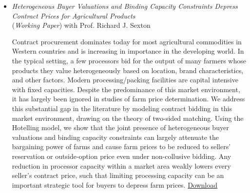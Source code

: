 \documentclass{article}[12]
\begin{document}
\begin{itemize}[itemsep=1.5em]
\item \emph{Heterogeneous Buyer Valuations and Binding Capacity Constraints Depress Contract Prices for Agricultural Products}
\\ (\emph{Working Paper}) with Prof. Richard J. Sexton

Contract procurement dominates today for most agricultural commodities in Western countries and is increasing in importance in the developing world. In the typical setting, a few processors bid for the output of many farmers whose products they value heterogeneously based on location, brand characteristics, and other factors. Modern processing/packing facilities are capital intensive with fixed capacities. Despite the predominance of this market environment, it has largely been ignored in studies of farm price determination. We address this substantial gap in the literature by modeling contract bidding in this market environment, drawing on the theory of two-sided matching. Using the Hotelling model, we show that the joint presence of heterogeneous buyer valuations and binding capacity constraints can largely attenuate the bargaining power of farms and cause farm prices to be reduced to sellers' reservation or outside-option price even under non-collusive bidding.
Any reduction in processor capacity within a market area weakly lowers every seller's contract price, such that limiting processing capacity can be an important strategic tool for buyers to depress farm prices.
\href{https://cliobserver.github.io/zhiran-AgEcon.github.io/files/Zhiran_Qin_Contract_Prices.pdf}{Download}


\end{itemize}



\end{document}
